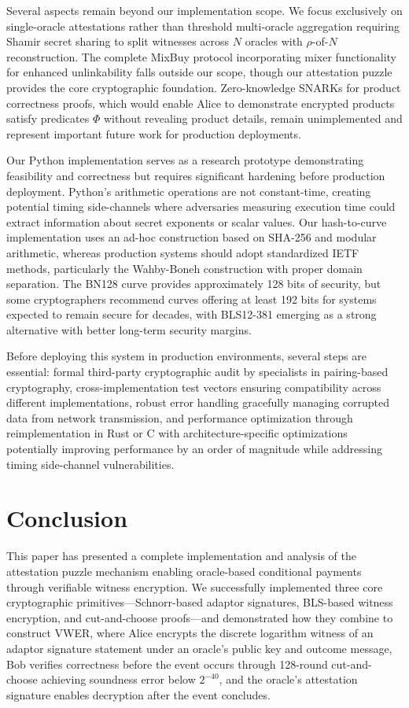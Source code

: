 \documentclass[11pt,a4paper]{article}
\begin{document}
{Several aspects remain beyond our implementation scope. We focus exclusively on single-oracle attestations rather than threshold multi-oracle aggregation requiring Shamir secret sharing to split witnesses across $N$ oracles with $\rho$-of-$N$ reconstruction. The complete MixBuy protocol incorporating mixer functionality for enhanced unlinkability falls outside our scope, though our attestation puzzle provides the core cryptographic foundation. Zero-knowledge SNARKs for product correctness proofs, which would enable Alice to demonstrate encrypted products satisfy predicates $\Phi$ without revealing product details, remain unimplemented and represent important future work for production deployments.

Our Python implementation serves as a research prototype demonstrating feasibility and correctness but requires significant hardening before production deployment. Python's arithmetic operations are not constant-time, creating potential timing side-channels where adversaries measuring execution time could extract information about secret exponents or scalar values. Our hash-to-curve implementation uses an ad-hoc construction based on SHA-256 and modular arithmetic, whereas production systems should adopt standardized IETF methods, particularly the Wahby-Boneh construction with proper domain separation. The BN128 curve provides approximately 128 bits of security, but some cryptographers recommend curves offering at least 192 bits for systems expected to remain secure for decades, with BLS12-381 emerging as a strong alternative with better long-term security margins.

Before deploying this system in production environments, several steps are essential: formal third-party cryptographic audit by specialists in pairing-based cryptography, cross-implementation test vectors ensuring compatibility across different implementations, robust error handling gracefully managing corrupted data from network transmission, and performance optimization through reimplementation in Rust or C with architecture-specific optimizations potentially improving performance by an order of magnitude while addressing timing side-channel vulnerabilities.

\section{Conclusion}

This paper has presented a complete implementation and analysis of the attestation puzzle mechanism enabling oracle-based conditional payments through verifiable witness encryption. We successfully implemented three core cryptographic primitives—Schnorr-based adaptor signatures, BLS-based witness encryption, and cut-and-choose proofs—and demonstrated how they combine to construct VWER, where Alice encrypts the discrete logarithm witness of an adaptor signature statement under an oracle's public key and outcome message, Bob verifies correctness before the event occurs through 128-round cut-and-choose achieving soundness error below $2^{-40}$, and the oracle's attestation signature enables decryption after the event concludes.

}
\end{document}
